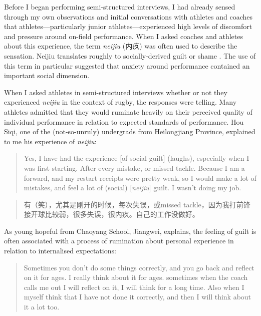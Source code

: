 \begin{CJK}{UTF8}{gbsn}
Before I began performing semi-structured interviews, I had already sensed through my own observations and initial conversations with athletes and coaches that athletes---particularly junior athletes---experienced high levels of discomfort and pressure around on-field performance. When I asked coaches and athletes about this experience, the term \textit{neijiu} (内疚) was often used to describe the sensation.  Neijiu translates roughly to socially-derived guilt or shame \citep{Pleco2018}.  The use of this term in particular suggested that anxiety around performance contained an important social dimension.

When I asked athletes in semi-structured interviews whether or not they experienced \textit{neijiu} in the context of rugby, the responses were telling.  Many athletes admitted that they would ruminate heavily on their perceived quality of individual performance in relation to expected standards of performance.  Hou Siqi, one of the (not-so-unruly) undergrads from Heilongjiang Province, explained to me his experience of \textit{neijiu}:

      \begin{quote}
        Yes, I have had the experience [of social guilt] (laughs), especially when I was first starting. After every mistake, or missed tackle.  Because I am a forward, and my restart receipts were pretty weak, so I would make a lot of mistakes, and feel a lot of (social) [\textit{neijiu}] guilt.  I wasn't doing my job.
      \end{quote}

      \begin{quote}
        有（笑），尤其是刚开的时候，每次失误，或missed tackle，因为我打前锋 接开球比较弱，很多失误，很内疚。自己的工作没做好。 
      \end{quote}

As young hopeful from Chaoyang School, Jiangwei, explains, the feeling of guilt is often associated with a process of rumination about personal experience in relation to internalised expectations:

      \begin{quote}
        Sometimes you don't do some things correctly, and you go back and reflect on it for ages. I really think about it for ages. sometimes when the coach calls me out I will reflect on it, I will think for a long time. Also when I myself think that I have not done it correctly, and then I will think about it a lot too.
      \end{quote}


\end{CJK}
